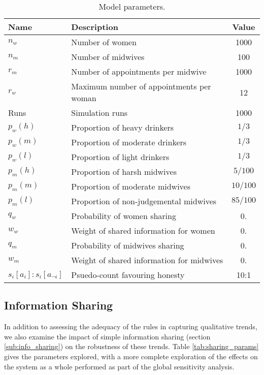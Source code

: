 \begin{table}
\center
\begin{tabular} {|l | l | c|}
\hline
Name & Description & Value \\ \hline
\(n_{w}\) & Number of women & 1000 \\ \hline
\(n_{m}\) & Number of midwives & 100 \\ \hline
\(r_{m}\) & Number of appointments per midwive & 1000 \\ \hline
\(r_{w}\) & Maximum number of appointments per woman & 12 \\ \hline
Runs & Simulation runs & 1000 \\ \hline
\(p_{w}(h)\) & Proportion of heavy drinkers & \(1/3\) \\ \hline
\(p_{w}(m)\) & Proportion of moderate drinkers & \(1/3\) \\ \hline
\(p_{w}(l)\) & Proportion of light drinkers & \(1/3\) \\ \hline
\(p_{m}(h)\) & Proportion of harsh midwives & \(5/100\) \\ \hline
\(p_{m}(m)\) & Proportion of moderate midwives & \(10/100\) \\ \hline
\(p_{m}(l)\) & Proportion of non-judgemental midwives & \(85/100\) \\ \hline
\(q_{w}\) & Probability of women sharing & 0. \\ \hline
\(w_{w}\) & Weight of shared information for women & 0. \\ \hline
\(q_{m}\) & Probability of midwives sharing & 0. \\ \hline
\(w_{m}\) & Weight of shared information for midwives & 0. \\ \hline
\(s_{i}[a_{i}]:s_{i}[a_{\neg i}]\) & Psuedo-count favouring honesty & 10:1 \\ \hline
\end{tabular}
\caption[Table caption text]{Model parameters. \label{tab:qt_params}}
\end{table}

\subsection{Information Sharing}

In addition to assessing the adequacy of the rules in capturing qualitative trends, we also examine the impact of simple information sharing (section \ref{sub:info_sharing}) on the robustness of these trends. Table \ref{tab:sharing_params} gives the parameters explored, with a more complete exploration of the effects on the system as a whole performed as part of the global sensitivity analysis.

